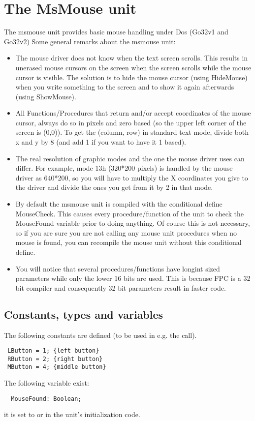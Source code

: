 \chapter{The MsMouse unit}
The msmouse unit provides basic mouse handling under Dos (Go32v1 and Go32v2)
Some general remarks about the msmouse unit:
\begin{itemize}
\item The mouse driver does not know when the text screen scrolls. This results
in unerased mouse cursors on the screen when the screen scrolls while the
mouse cursor is visible. The solution is to hide the mouse cursor (using
HideMouse) when you write something to the screen and to show it again
afterwards (using ShowMouse).
\item All Functions/Procedures that return and/or accept coordinates of the mouse
cursor, always do so in pixels and zero based (so the upper left corner of
the screen is (0,0)). To get the (column, row) in standard text mode, divide
both x and y by 8 (and add 1 if you want to have it 1 based).
\item The real resolution of graphic modes and the one the mouse driver uses can
differ. For example, mode 13h (320*200 pixels) is handled by the mouse driver
as 640*200, so you will have to multiply the X coordinates you give to the
driver and divide the ones you get from it by 2 in that mode.
\item By default the msmouse unit is compiled with the conditional define
MouseCheck. This causes every procedure/function of the unit to check the
MouseFound variable prior to doing anything. Of course this is not necessary,
so if you are sure you are not calling any mouse unit procedures when no
mouse is found, you can recompile the mouse unit without this conditional
define.
\item
You will notice that several procedures/functions have longint sized
parameters while only the lower 16 bits are used. This is because FPC is
a 32 bit compiler and consequently 32 bit parameters result in faster code.
\end{itemize}
\section{Constants, types and variables}
The following constants are defined (to be used in e.g. the
 call).
\begin{verbatim}
 LButton = 1; {left button}
 RButton = 2; {right button}
 MButton = 4; {middle button}
\end{verbatim}
The following variable exist: 
\begin{verbatim}
  MouseFound: Boolean;
\end{verbatim}
it is set to  or  in the unit's initialization code.
